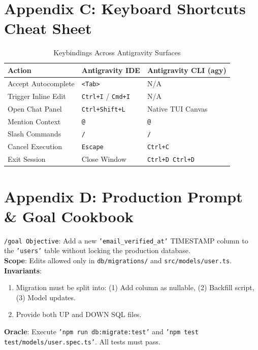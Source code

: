 \documentclass[11pt,a4paper,oneside]{book}
\begin{document}
\chapter{Appendix C: Keyboard Shortcuts Cheat Sheet}

\begin{table}[htbp]
\centering
\caption{Keybindings Across Antigravity Surfaces}
\begin{tabularx}{\textwidth}{lll}
\toprule
\textbf{Action} & \textbf{Antigravity IDE} & \textbf{Antigravity CLI (agy)} \\
\midrule
Accept Autocomplete & \texttt{<Tab>} & N/A \\
Trigger Inline Edit & \texttt{Ctrl+I} / \texttt{Cmd+I} & N/A \\
Open Chat Panel & \texttt{Ctrl+Shift+L} & Native TUI Canvas \\
Mention Context & \texttt{@} & \texttt{@} \\
Slash Commands & \texttt{/} & \texttt{/} \\
Cancel Execution & \texttt{Escape} & \texttt{Ctrl+C} \\
Exit Session & Close Window & \texttt{Ctrl+D Ctrl+D} \\
\bottomrule
\end{tabularx}
\end{table}

\chapter{Appendix D: Production Prompt \& Goal Cookbook}

\begin{promptbox}
\texttt{/goal Objective}: Add a new \texttt{'email\_verified\_at'} TIMESTAMP column to the \texttt{'users'} table without locking the production database.\\
\textbf{Scope}: Edits allowed only in \texttt{db/migrations/} and \texttt{src/models/user.ts}.\\
\textbf{Invariants}:
\begin{enumerate}
    \item Migration must be split into: (1) Add column as nullable, (2) Backfill script, (3) Model updates.
    \item Provide both UP and DOWN SQL files.
\end{enumerate}
\textbf{Oracle}: Execute \texttt{'npm run db:migrate:test'} and \texttt{'npm test test/models/user.spec.ts'}. All tests must pass.
\end{promptbox}
\end{document}
